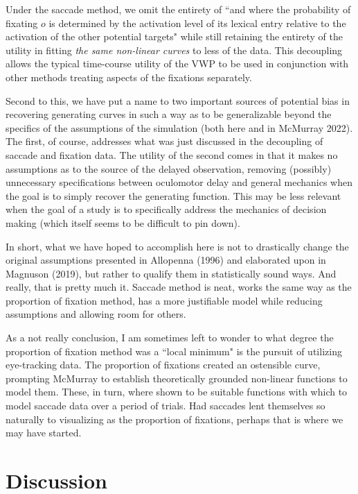 \documentclass{article}
\begin{document}
Under the saccade method, we omit the entirety of ``and where the probability of fixating $o$ is determined by the activation level of its lexical entry relative to the activation of the other potential targets" while still retaining the entirety of the utility in fitting \textit{the same non-linear curves} to less of the data. This decoupling allows the typical time-course utility of the VWP to be used in conjunction with other  methods treating aspects of the fixations separately.

Second to this, we have put a name to two important sources of potential bias in recovering generating curves in such a way as to be generalizable beyond the specifics of the assumptions of the simulation (both here and in McMurray 2022). The first, of course, addresses what was just discussed in the decoupling of saccade and fixation data. The utility of the second comes in that it makes no assumptions as to the source of the delayed observation, removing (possibly) unnecessary specifications between oculomotor delay and general mechanics when the goal is to simply recover the generating function. This may be less relevant when the goal of a study is to specifically address the mechanics of decision making (which itself seems to be difficult to pin down).

In short, what we have hoped to accomplish here is not to drastically change the original assumptions presented in Allopenna (1996) and elaborated upon in Magnuson (2019), but rather to qualify them in statistically sound ways. And really, that is pretty much it. Saccade method is neat, works the same way as the proportion of fixation method, has a more justifiable model while reducing assumptions and allowing room for others.

As a not really conclusion, I am sometimes left to wonder to what degree the proportion of fixation method was a  ``local minimum" is the pursuit of utilizing eye-tracking data. The proportion of fixations created an ostensible curve, prompting McMurray to establish theoretically grounded non-linear functions to model them. These, in turn, where shown to be suitable functions with which to model saccade data over a period of trials. Had saccades lent themselves so naturally to visualizing as the proportion of fixations, perhaps that is where we may have started.




\section{Discussion}
\end{document}
